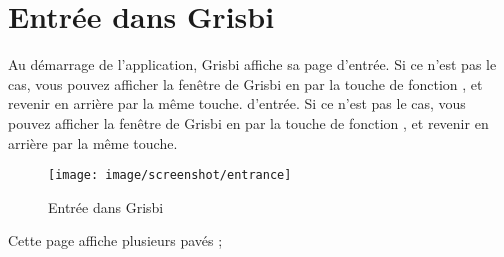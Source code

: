 
\chapter{Entrée dans Grisbi\label{entrance}}

Au démarrage de l'application, Grisbi affiche sa page 
\ifIllustration d'entrée. Si ce n'est pas le cas, vous pouvez afficher la fenêtre de Grisbi en  par la touche de fonction , et revenir en arrière par la même touche.
\else d'entrée. Si ce n'est pas le cas, vous pouvez afficher la fenêtre de Grisbi en  par la touche de fonction , et revenir en arrière par la même touche.
\fi





\ifIllustration
\begin{figure}[htbp]
\begin{center}
\texttt{[image: image/screenshot/entrance]}
\end{center}
\caption{Entrée dans Grisbi}
\label{entrance-img}
\end{figure}
\fi


Cette page affiche plusieurs pavés ;

